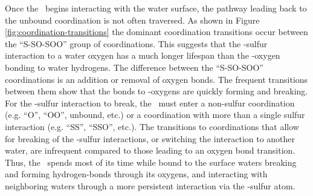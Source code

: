 Once the \suldiox~begins interacting with the water surface, the pathway leading back to the unbound coordination is not often traversed. As shown in Figure \ref{fig:coordination-transitions} the dominant coordination transitions occur between the ``S-SO-SOO'' group of coordinations. This suggests that the \suldiox-sulfur interaction to a water oxygen has a much longer lifespan than the \suldiox-oxygen bonding to water hydrogens. The difference between the ``S-SO-SOO'' coordinations is an addition or removal of oxygen bonds. The frequent transitions between them show that the bonds to \suldiox-oxygens are quickly forming and breaking. For the \suldiox-sulfur interaction to break, the \suldiox~must enter a non-sulfur coordination (e.g. ``O'', ``OO'', unbound, etc.) or a coordination with more than a single sulfur interaction (e.g. ``SS'', ``SSO'', etc.). The transitions to coordinations that allow for breaking of the \suldiox-sulfur interactions, or switching the interaction to another water, are infrequent compared to those leading to an oxygen bond transition. Thus, the \suldiox~spends most of its time while bound to the surface waters breaking and forming hydrogen-bonds through its oxygens, and interacting with neighboring waters through a more persistent interaction via the \suldiox-sulfur atom.
